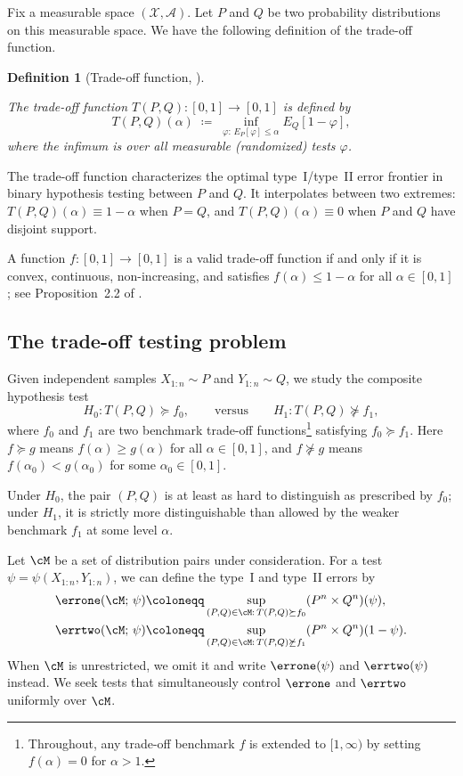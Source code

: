 \documentclass[english]{article}
\theoremstyle{plain}
\newtheorem{definition}{Definition}[section]
\theoremstyle{definition}
\newcommand{\Toff}[2]{T(#1,#2)}
\newcommand{\fnull}{f_0}
\newcommand{\falt}{f_1}
\begin{document}
Fix a measurable space $(\mathcal{X}, \mathcal{A})$. 
Let $P$ and $Q$ be two probability distributions on this measurable space.
We have the following definition of the trade-off function.

\begin{definition}[Trade-off function, {\cite{GDP}}]\label{def:tradeoff}

The \emph{trade-off function} $\Toff{P}{Q}: [0,1] \to [0,1]$ is defined by
\[
\Toff{P}{Q}(\alpha) \;\coloneqq\; \inf_{\varphi:\, E_P[\varphi] \leqslant \alpha} E_Q[1-\varphi],
\]
where the infimum is over all measurable (randomized) tests $\varphi$.
\end{definition}

\noindent The trade-off function characterizes the optimal type~I/type~II
error frontier in binary hypothesis testing between $P$ and $Q$. 
It interpolates between two extremes:
$\Toff{P}{Q}(\alpha) \equiv 1-\alpha$ when $P=Q$, and $\Toff{P}{Q}(\alpha) \equiv 0$ when $P$ and $Q$ have
disjoint support.

A function $f:[0,1]\to[0,1]$ is a valid trade-off
function if and only if it is convex, continuous, non-increasing, and
satisfies $f(\alpha)\leqslant 1-\alpha$ for all $\alpha\in[0,1]$; see
Proposition~2.2 of \cite{GDP}.

\subsection{The trade-off testing problem}

Given independent samples $X_{1:n} \sim P$ and $Y_{1:n} \sim Q$, we study the
composite hypothesis test
\begin{equation}\label{eq:H}
H_0: \Toff{P}{Q} \succeq \fnull, \qquad \text{versus} \qquad H_1: \Toff{P}{Q} \not\succeq \falt,
\end{equation}
where $\fnull$ and $\falt$ are two benchmark trade-off functions\footnote{Throughout, any trade-off benchmark \(f\) is extended to \([1,\infty)\) by
setting \(f(\alpha)=0\) for \(\alpha>1\).}
satisfying $\fnull \succeq \falt$. Here $f \succeq g$ means
$f(\alpha)\geqslant g(\alpha)$ for all $\alpha\in[0,1]$, and
$f \not\succeq g$ means $f(\alpha_0)<g(\alpha_0)$ for some $\alpha_0 \in [0,1]$.

Under $H_0$, the pair $(P,Q)$ is at least as hard
to distinguish as prescribed by $\fnull$; under $H_1$,  it is strictly  more distinguishable than allowed
by the weaker benchmark $\falt$ at some level $\alpha$.


Let $\cM$ be a set of distribution pairs under consideration. 
For a test $\psi = \psi(X_{1:n}, Y_{1:n})$, we can define the type~I and type~II errors by
\begin{align*}
\errone(\cM;\, \psi) &\coloneqq \sup_{(P,Q) \in \cM:\, \Toff{P}{Q} \succeq \fnull} (P^n \times Q^n)(\psi), \\
\errtwo(\cM;\, \psi) &\coloneqq \sup_{(P,Q) \in \cM:\, \Toff{P}{Q} \not\succeq \falt} (P^n \times Q^n)(1 - \psi).
\end{align*}
When $\cM$ is unrestricted, we omit it and write $\errone(\psi)$ and
$\errtwo(\psi)$ instead. 
We seek tests that simultaneously control $\errone$ and $\errtwo$ uniformly over $\cM$.
\end{document}

